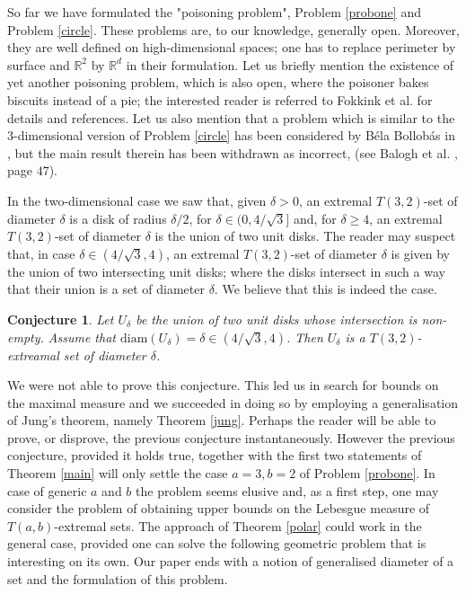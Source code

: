 \documentclass[12pt]{article}
\newtheorem{conj}[thm]{Conjecture}
\begin{document}
So far we have formulated the "poisoning problem", Problem \ref{probone} and Problem \ref{circle}. 
These problems are, to our knowledge, 
generally open.  
Moreover, they are well defined on high-dimensional spaces; one has  to
replace perimeter by surface and $\mathbb{R}^2$ by $\mathbb{R}^d$ in their formulation. 
Let us briefly mention the existence of yet another poisoning problem, which is also open, where 
the poisoner bakes biscuits instead of a pie; the interested reader is referred to Fokkink et al. \cite{Fokkink} for 
details and references.  Let us also mention that a problem which is similar to the 
$3$-dimensional version of Problem \ref{circle} 
has been considered by B\'ela Bollob\'as in \cite{Bollobas},  but the main result therein has been withdrawn 
as incorrect, (see Balogh et al. \cite{Balogh}, page $47$).

In the two-dimensional case we saw that, given $\delta>0$,
an extremal $T(3,2)$-set of diameter $\delta$ is a disk of radius $\delta/2$, for $\delta\in (0,4/\sqrt{3}]$ and,
for $\delta\geq 4$, an extremal $T(3,2)$-set of diameter $\delta$ is the union of two unit disks. 
The reader may suspect that, in case 
$\delta\in (4/\sqrt{3}, 4)$, an extremal $T(3,2)$-set of diameter $\delta$ 
is given by the union of two intersecting unit disks; 
where the disks intersect 
in such a way that their union is a set of diameter $\delta$.  
We believe that this is indeed the case.

\begin{conj} Let $U_{\delta}$ be the union of two unit disks whose intersection is non-empty. Assume that
$\text{diam}(U_{\delta})= \delta \in (4/\sqrt{3},4)$. Then $U_{\delta}$ is 
a $T(3,2)$-extreamal set of diameter $\delta$.
\end{conj}

We were not able to prove this conjecture. This led us in search for bounds on the maximal measure 
and we succeeded in doing so by employing a generalisation of Jung's theorem, namely Theorem \ref{jung}.
Perhaps the reader will be able to prove, or disprove, the previous conjecture instantaneously. 
However the previous conjecture, provided it holds true, together with the first two statements of Theorem 
\ref{main} will only settle the case $a=3, b=2$ of Problem \ref{probone}. In case of generic $a$ and 
$b$ the problem seems elusive and, as a first step, one may consider the problem of obtaining 
upper bounds on the Lebesgue measure of $T(a,b)$-extremal sets.  
The approach of Theorem \ref{polar} could work in the general case, provided one can 
solve the following geometric problem that is interesting on its own. 
Our paper ends with a notion of generalised diameter of a set and the formulation of this problem. 
\end{document}
